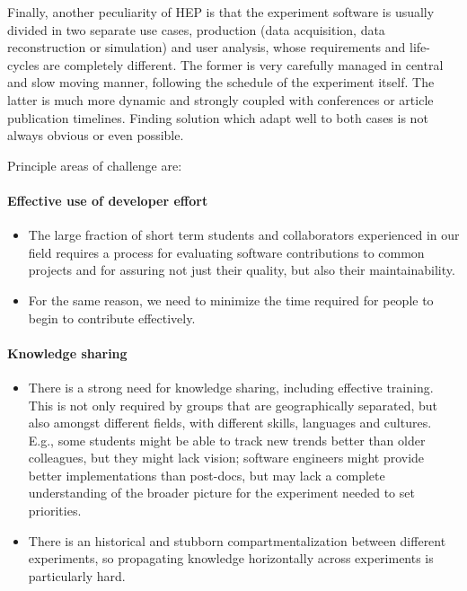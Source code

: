 \documentclass[12pt,a4paper]{article}
\begin{document}
Finally, another peculiarity of HEP is that the experiment software is
usually divided in two separate use cases, production (data acquisition,
data reconstruction or simulation) and user analysis, whose requirements
and life-cycles are completely different. The former is very carefully
managed in central and slow moving manner, following the schedule of the
experiment itself. The latter is much more dynamic and strongly coupled
with conferences or article publication timelines. Finding solution
which adapt well to both cases is not always obvious or even possible.

Principle areas of challenge are:

\paragraph{Effective use of developer effort}

\begin{itemize}
\item
    The large fraction of short term students and collaborators
  experienced in our field requires a process for evaluating software
  contributions to common projects and for assuring not just their
  quality, but also their maintainability.
  \item
    For the same reason, we need to minimize the time required for people
  to begin to contribute effectively.
\end{itemize}

\paragraph{Knowledge sharing}

\begin{itemize}
\item
    There is a strong need for knowledge sharing, including effective
  training. This is not only required by groups that are geographically
  separated, but also amongst different fields, with different skills,
  languages and cultures. E.g., some students might be able to track new
  trends better than older colleagues, but they might lack vision;
  software engineers might provide better implementations than
  post-docs, but may lack a complete understanding of the broader
  picture for the experiment needed to set priorities.
  \item
    There is an historical and stubborn compartmentalization between
  different experiments, so propagating knowledge horizontally across
  experiments is particularly hard.
\end{itemize}
\end{document}
